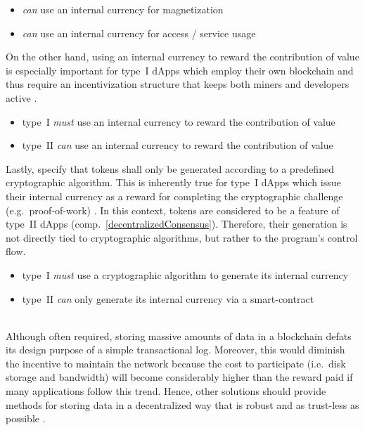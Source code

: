 \begin{description}[format={\storedescriptionlabel}]
	\begin{itemize}
  		\item \textit{can} use an internal currency for magnetization
  		\item \textit{can} use an internal currency for access / service usage
	\end{itemize}
	
	On the other hand, using an internal currency to reward the contribution of value is especially important for type~I \acp{dApp} which employ their own blockchain and thus require an incentivization structure that keeps both miners and developers active \cite[p.~9]{Raval.2016}.
	
	\begin{itemize}
		\item type~I \textit{must} use an internal currency to reward the contribution of value
		\item type~II \textit{can} use an internal currency to reward the contribution of value
	\end{itemize}
	
	Lastly, \citeauthor{Johnston2015} specify that tokens shall only be generated according to a predefined cryptographic algorithm. This is inherently true for type~I \acp{dApp} which issue their internal currency as a reward for completing the cryptographic challenge (e.g.~proof-of-work) \cite[pp.~3--4]{bitcoin}. In this context, tokens are considered to be a feature of type~II \acp{dApp} (comp.~\ref{decentralizedConsensus}). Therefore, their generation is not directly tied to cryptographic algorithms, but rather to the program's control flow.
	
	\begin{itemize}
		\item type~I \textit{must} use a cryptographic algorithm to generate its internal currency
		\item type~II \textit{can} only generate its internal currency via a smart-contract
	\end{itemize}
	
	\item[Decentralized protocols]
	\hfill \\
	Although often required, storing massive amounts of data in a blockchain defats its design purpose of a simple transactional log. Moreover, this would diminish the incentive to maintain the network because the cost to participate (i.e.~disk storage and bandwidth) will become considerably higher than the reward paid if many applications follow this trend. Hence, other solutions should provide methods for storing data in a decentralized way that is robust and as trust-less as possible \cite[pp.~25]{Raval.2016}.  
	

\end{description}
